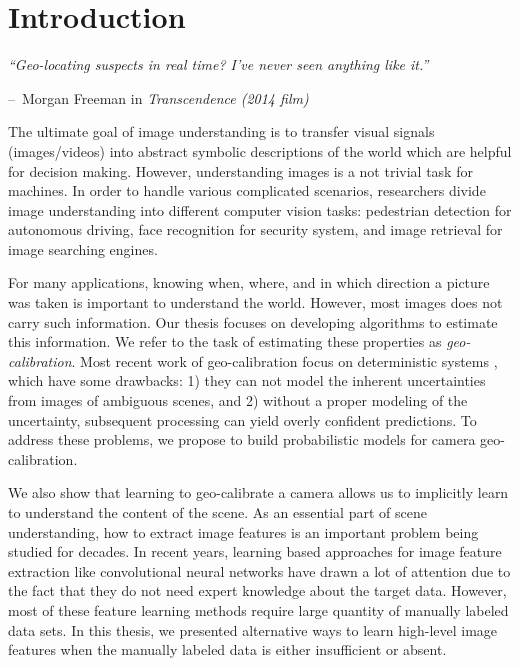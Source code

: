 \chapter{Introduction}
\label{chap:intro}

\makeatletter
\newenvironment{chapquote}[2][2em]
{\setlength{\@tempdima}{#1} \def\chapquote@author{#2} \parshape 1
  \@tempdima \dimexpr\textwidth-2\@tempdima\relax \itshape}
{\par\normalfont\hfill--\
\chapquote@author\hspace*{\@tempdima}\par\bigskip}
\makeatother

\begin{chapquote}{Morgan Freeman in {\em Transcendence (2014 film)}}
  ``Geo-locating suspects in real time? I've never seen anything like
it.''
\end{chapquote}

The ultimate goal of image understanding is to transfer visual
signals (images/videos) into abstract symbolic descriptions of the
world which are helpful for decision making.
However, understanding images is a not trivial task for machines.
In order to handle various complicated scenarios, researchers divide
image understanding into different computer vision tasks: pedestrian
detection for autonomous driving, face recognition for security
system, and image retrieval for image searching engines.

For many applications, knowing when, where, and in which direction a
picture was taken is important to understand the world. However, most
images does not carry such information. Our thesis focuses on
developing algorithms to estimate this information.
We refer to the task of estimating these properties as {\em
geo-calibration}.
Most recent work of geo-calibration focus on deterministic systems
\todo{citations}, 
which have some drawbacks: 1) they can not model the inherent
uncertainties from images of ambiguous scenes, and 2) without a proper
modeling of the uncertainty, subsequent processing can yield overly
confident predictions. To address these problems, we propose to build
probabilistic models for camera geo-calibration.

We also show that learning to geo-calibrate a camera allows us to
implicitly learn to understand the content of the scene.
As an essential part of scene understanding, how to extract image
features is an important problem being studied for decades.  In
recent years, learning based approaches for image feature extraction
like convolutional neural networks have drawn a lot of attention due
to the fact that they do not need expert knowledge about the target
data. However, most of these feature learning methods require large
quantity of manually labeled data sets.  In this thesis, we presented
alternative ways to learn high-level image features when the
manually labeled data is either insufficient or absent.


